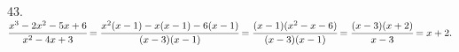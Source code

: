 43. $\cfrac{x^3-2x^2-5x+6}{x^2-4x+3}=\cfrac{x^2(x-1)-x(x-1)-6(x-1)}{(x-3)(x-1)}=\cfrac{(x-1)(x^2-x-6)}{(x-3)(x-1)}=\cfrac{(x-3)(x+2)}{x-3}=x+2.$\\
